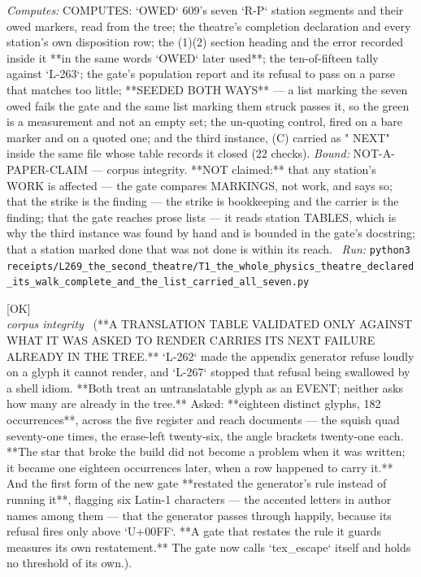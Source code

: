 \begin{description}
\emph{Computes:} COMPUTES: `OWED` 609's seven `R-P` station segments and their owed markers, read from the tree; the theatre's completion declaration and every station's own disposition row; the (1)(2) section heading and the error recorded inside it **in the same words `OWED` later used**; the ten-of-fifteen tally against `L-263`; the gate's population report and its refusal to pass on a parse that matches too little; **SEEDED BOTH WAYS** --- a list marking the seven owed fails the gate and the same list marking them struck passes it, so the green is a measurement and not an empty set; the un-quoting control, fired on a bare marker and on a quoted one; and the third instance, (C) carried as " NEXT" inside the same file whose table records it closed (22 checks).
 \emph{Bound:} NOT-A-PAPER-CLAIM --- corpus integrity. **NOT claimed:** that any station's WORK is affected --- the gate compares MARKINGS, not work, and says so; that the strike is the finding --- the strike is bookkeeping and the carrier is the finding; that the gate reaches prose lists --- it reads station TABLES, which is why the third instance was found by hand and is bounded in the gate's docstring; that a station marked done that was not done is within its reach.
\ \emph{Run:} \texttt{python3 receipts/L269\_the\_second\_theatre/T1\_the\_whole\_physics\_theatre\_declared\_its\_walk\_complete\_and\_the\_list\_carried\_all\_seven.py}
\item[\label{rcpt:V1_a_translation_table_validated_only_against_what_it_was_asked_to_render}\texttt{V1\_a\_translation\_table\_validated\_only\_against\_what\_it\_was\_asked\_to\_render}]\hfill\textsf{[OK]}\\
\textit{corpus integrity} \ (**A TRANSLATION TABLE VALIDATED ONLY AGAINST WHAT IT WAS ASKED TO RENDER CARRIES ITS NEXT FAILURE ALREADY IN THE TREE.** `L-262` made the appendix generator refuse loudly on a glyph it cannot render, and `L-267` stopped that refusal being swallowed by a shell idiom. **Both treat an untranslatable glyph as an EVENT; neither asks how many are already in the tree.** Asked: **eighteen distinct glyphs, 182 occurrences**, across the five register and reach documents --- the squish quad seventy-one times, the erase-left twenty-six, the angle brackets twenty-one each. **The star that broke the build did not become a problem when it was written; it became one eighteen occurrences later, when a row happened to carry it.** And the first form of the new gate **restated the generator's rule instead of running it**, flagging six Latin-1 characters --- the accented letters in author names among them --- that the generator passes through happily, because its refusal fires only above `U+00FF`. **A gate that restates the rule it guards measures its own restatement.** The gate now calls `tex\_escape` itself and holds no threshold of its own.). 

\end{description}

